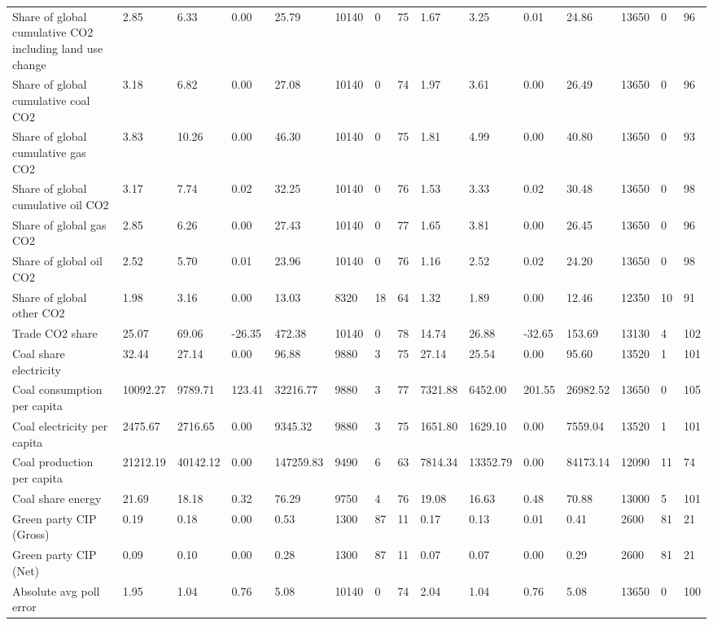\begin{longtable}{lllllllllllllll}
Share of global cumulative CO2 including land use change & 2.85 & 6.33 & 0.00 & 25.79 & 10140 & 0 & 75 & 1.67 & 3.25 & 0.01 & 24.86 & 13650 & 0 & 96\\
Share of global cumulative coal CO2 & 3.18 & 6.82 & 0.00 & 27.08 & 10140 & 0 & 74 & 1.97 & 3.61 & 0.00 & 26.49 & 13650 & 0 & 96\\
Share of global cumulative gas CO2 & 3.83 & 10.26 & 0.00 & 46.30 & 10140 & 0 & 75 & 1.81 & 4.99 & 0.00 & 40.80 & 13650 & 0 & 93\\
Share of global cumulative oil CO2 & 3.17 & 7.74 & 0.02 & 32.25 & 10140 & 0 & 76 & 1.53 & 3.33 & 0.02 & 30.48 & 13650 & 0 & 98\\
\addlinespace
Share of global gas CO2 & 2.85 & 6.26 & 0.00 & 27.43 & 10140 & 0 & 77 & 1.65 & 3.81 & 0.00 & 26.45 & 13650 & 0 & 96\\
Share of global oil CO2 & 2.52 & 5.70 & 0.01 & 23.96 & 10140 & 0 & 76 & 1.16 & 2.52 & 0.02 & 24.20 & 13650 & 0 & 98\\
Share of global other CO2 & 1.98 & 3.16 & 0.00 & 13.03 & 8320 & 18 & 64 & 1.32 & 1.89 & 0.00 & 12.46 & 12350 & 10 & 91\\
Trade CO2 share & 25.07 & 69.06 & -26.35 & 472.38 & 10140 & 0 & 78 & 14.74 & 26.88 & -32.65 & 153.69 & 13130 & 4 & 102\\
Coal share electricity & 32.44 & 27.14 & 0.00 & 96.88 & 9880 & 3 & 75 & 27.14 & 25.54 & 0.00 & 95.60 & 13520 & 1 & 101\\
\addlinespace
Coal consumption per capita & 10092.27 & 9789.71 & 123.41 & 32216.77 & 9880 & 3 & 77 & 7321.88 & 6452.00 & 201.55 & 26982.52 & 13650 & 0 & 105\\
Coal electricity per capita & 2475.67 & 2716.65 & 0.00 & 9345.32 & 9880 & 3 & 75 & 1651.80 & 1629.10 & 0.00 & 7559.04 & 13520 & 1 & 101\\
Coal production per capita & 21212.19 & 40142.12 & 0.00 & 147259.83 & 9490 & 6 & 63 & 7814.34 & 13352.79 & 0.00 & 84173.14 & 12090 & 11 & 74\\
Coal share energy & 21.69 & 18.18 & 0.32 & 76.29 & 9750 & 4 & 76 & 19.08 & 16.63 & 0.48 & 70.88 & 13000 & 5 & 101\\
Green party CIP (Gross) & 0.19 & 0.18 & 0.00 & 0.53 & 1300 & 87 & 11 & 0.17 & 0.13 & 0.01 & 0.41 & 2600 & 81 & 21\\
\addlinespace
Green party CIP (Net) & 0.09 & 0.10 & 0.00 & 0.28 & 1300 & 87 & 11 & 0.07 & 0.07 & 0.00 & 0.29 & 2600 & 81 & 21\\
Absolute avg poll error & 1.95 & 1.04 & 0.76 & 5.08 & 10140 & 0 & 74 & 2.04 & 1.04 & 0.76 & 5.08 & 13650 & 0 & 100\\

\end{longtable}
